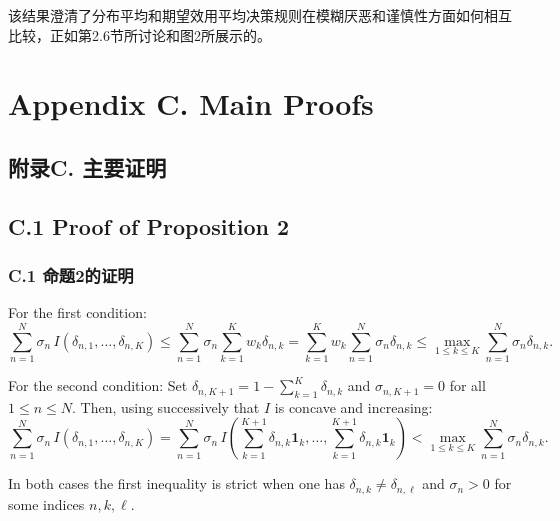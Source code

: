 \documentclass[12pt,a4paper]{article}
\newenvironment{original}
  {\par\noindent\ignorespaces}
  {\par}
\newenvironment{translation}
  {\par\noindent{\color{transblue}\ignorespaces}}
  {\par\medskip}
\begin{document}
\begin{translation}
该结果澄清了分布平均和期望效用平均决策规则在模糊厌恶和谨慎性方面如何相互比较，正如第2.6节所讨论和图2所展示的。
\end{translation}

\newpage
\section*{Appendix C. Main Proofs}
{\color{transblue}\subsection*{附录C. 主要证明}}

\subsection*{C.1 Proof of Proposition 2}
{\color{transblue}\subsubsection*{C.1 命题2的证明}}

\begin{original}
For the first condition:
\[
\sum_{n=1}^{N} \sigma_{n} \, I(\delta_{n,1}, \dots, \delta_{n,K})
\leq \sum_{n=1}^{N} \sigma_{n} \sum_{k=1}^{K} w_{k} \delta_{n,k}
= \sum_{k=1}^{K} w_{k} \sum_{n=1}^{N} \sigma_{n} \delta_{n,k}
\leq \max_{1 \leq k \leq K} \sum_{n=1}^{N} \sigma_{n} \delta_{n,k}.
\]

For the second condition: Set $\delta_{n,K+1} = 1 - \sum_{k=1}^{K} \delta_{n,k}$ and $\sigma_{n,K+1} = 0$ for all $1 \leq n \leq N$. Then, using successively that $I$ is concave and increasing:
\[
\sum_{n=1}^{N} \sigma_{n} \, I(\delta_{n,1}, \dots, \delta_{n,K})
= \sum_{n=1}^{N} \sigma_{n} \, I\!\left( \sum_{k=1}^{K+1} \delta_{n,k} \mathbf{1}_{k}, \dots, \sum_{k=1}^{K+1} \delta_{n,k} \mathbf{1}_{k} \right)
< \max_{1 \leq k \leq K} \sum_{n=1}^{N} \sigma_{n} \delta_{n,k}.
\]

In both cases the first inequality is strict when one has $\delta_{n,k} \neq \delta_{n,\ell}$ and $\sigma_{n} > 0$ for some indices $n, k, \ell$.
\end{original}
\end{document}
